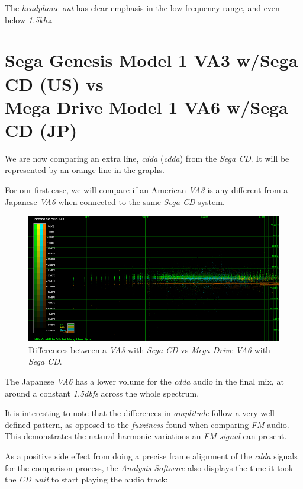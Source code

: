 \documentclass[10pt,a4paper]{report}
\newcommand{\define}[1]{\textit{\acrlong{#1}} (\textit{\acrshort{#1}})}
\newcommand{\ac}[1]{\textit{\mbox{\acrshort{#1}}}}
\newcommand{\khz}[1]{\textit{\mbox{#1\acrshort{khz}}}}
\newcommand{\db}[1]{\textit{\mbox{#1\acrshort{dbfs}}}}
\begin{document}
The \textit{headphone out} has clear emphasis in the low frequency range, and even below \khz{1.5}.

\section{Sega Genesis Model 1 VA3 w/Sega CD (US) vs\\ Mega Drive Model 1 VA6 w/Sega CD (JP)}
\label{signaldefinition}

We are now comparing an extra line, \define{cdda} from the \textit{Sega CD}. It will be represented by an orange line in the graphs.

For our first case, we will compare if an American \textit{VA3} is any different from a Japanese \textit{VA6} when connected to the same \textit{Sega CD} system.

\begin{figure}[H]
	\centering
	\includegraphics[width=1.0\linewidth]{images/results/10-A-MD1UTVA3-SCD-LA_vs_A-MD1JJVA6-SCD.png}
	\caption[A-MD1UTVA3-SCD-LA vs A-MD1JJVA6-SCD]{Differences between a \textit{VA3} with \textit{Sega CD} vs \textit{Mega Drive VA6} with \textit{Sega CD}.}
	\label{fig:A-MD1UTVA3-SCD-LA_vs_A-MD1JJVA6-SCD}
\end{figure}

The Japanese \textit{VA6} has a lower volume for the \ac{cdda} audio in the final mix, at around a constant \db{1.5} across the whole spectrum.

It is interesting to note that the differences in \textit{amplitude} follow a very well defined pattern, as opposed to the \textit{fuzziness} found when comparing \textit{FM} audio. This demonstrates the natural harmonic variations an \textit{FM signal} can present.

As a positive side effect from doing a precise frame alignment of the \ac{cdda} signals for the comparison process, the \textit{Analysis Software} also displays the time it took the \textit{CD unit} to start playing the audio track:
\end{document}
